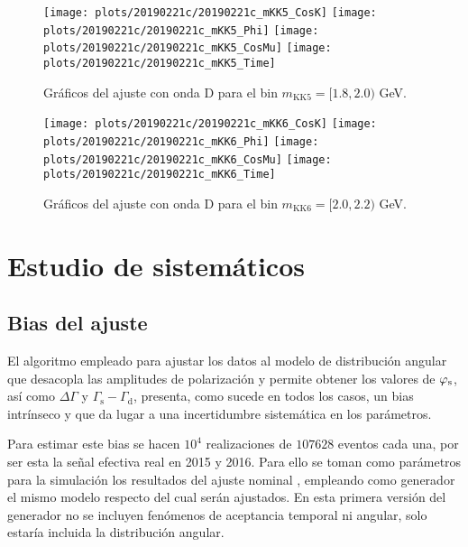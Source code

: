 \begin{figure}[H]
\centering
\begin{multicols}{2}
\texttt{[image: plots/20190221c/20190221c\_mKK5\_CosK]}
\texttt{[image: plots/20190221c/20190221c\_mKK5\_Phi]}
\texttt{[image: plots/20190221c/20190221c\_mKK5\_CosMu]}
\texttt{[image: plots/20190221c/20190221c\_mKK5\_Time]}
\end{multicols}
\vspace*{-0.5cm}
\caption{Gráficos del ajuste con onda D para el bin $m_{\text{KK}5} = [1.8,2.0)$ GeV.}  
\end{figure}

\begin{figure}[H]
\centering
\begin{multicols}{2}
\texttt{[image: plots/20190221c/20190221c\_mKK6\_CosK]}
\texttt{[image: plots/20190221c/20190221c\_mKK6\_Phi]}
\texttt{[image: plots/20190221c/20190221c\_mKK6\_CosMu]}
\texttt{[image: plots/20190221c/20190221c\_mKK6\_Time]}
\end{multicols}
\vspace*{-0.5cm}
\caption{Gráficos del ajuste con onda D para el bin $m_{\text{KK}6} = [2.0,2.2)$ GeV.}  \label{fig:20190221c_mKK6}
\end{figure}







\section{Estudio de sistemáticos}

\subsection{Bias del ajuste}

El algoritmo empleado para ajustar los datos al modelo de distribución angular que desacopla las amplitudes de polarización y permite obtener los valores de $\varphi_{\text{s}}$, así como $\Delta \Gamma$ y $\Gamma_{\text{s}} - \Gamma_{\text{d}}$, presenta, como sucede en todos los casos, un bias intrínseco y que da lugar a una incertidumbre sistemática en los parámetros.

Para estimar este bias se hacen $10^4$ realizaciones de $107628$ eventos cada una, por ser esta la señal efectiva real en 2015 y 2016. Para ello se toman como parámetros para la simulación los resultados del ajuste nominal \cite{paperPhis}, empleando como generador el mismo modelo respecto del cual serán ajustados. En esta primera versión del generador no se incluyen fenómenos de aceptancia temporal ni angular, solo estaría incluida la distribución angular.

